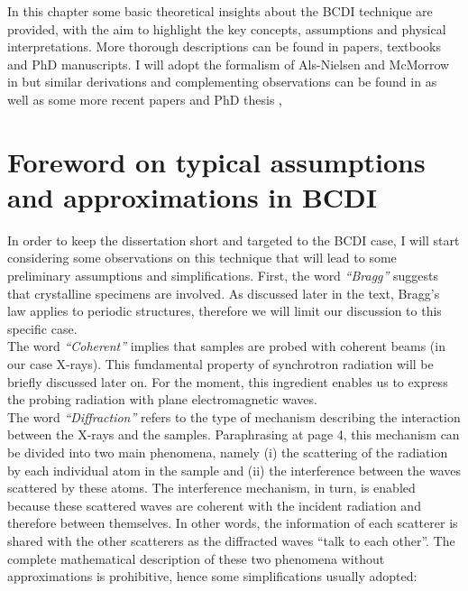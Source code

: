 
In this chapter some basic theoretical insights about the BCDI technique are provided, with the aim to highlight the key 
concepts, assumptions and physical interpretations. More thorough descriptions can be found in papers, textbooks 
and PhD manuscripts. I will adopt the formalism of Als-Nielsen and McMorrow in \cite{alsnielsen_mcmorrow2011} but similar 
derivations and complementing observations can be found in \cite{guinier1994, paganin2006coherent} as well as some more recent papers \cite{vartanyants2013coherentxraydiffractionimaging} 
and PhD thesis \cite{dupraz:tel-01285735, girard:tel-02906931}
, 

\section{Foreword on typical assumptions and approximations in BCDI}
In order to keep the dissertation short and targeted to the BCDI case, I will start considering some observations on this
technique that will lead to some preliminary assumptions and simplifications. First, the word \textit{``Bragg''} suggests that 
crystalline specimens are involved. As discussed later in the text, Bragg's law applies to periodic structures, therefore 
we will limit our discussion to this specific case. \\
The word \textit{``Coherent''} implies that samples are probed with coherent beams (in our case X-rays). This fundamental property of 
synchrotron radiation will be briefly discussed later on. For the moment, this ingredient enables us to express the 
probing radiation with plane electromagnetic waves. \\
The word \textit{``Diffraction''} refers to the type of mechanism describing the interaction between the X-rays and the 
samples. Paraphrasing \cite{guinier1994} at page 4, this mechanism can be divided into two main phenomena, namely (i) 
the scattering of the radiation by each individual atom in the sample and (ii) the interference between the waves scattered 
by these atoms. The interference mechanism, in turn, is enabled because these scattered waves are coherent with the incident 
radiation and therefore between themselves. In other words, the information of each scatterer is shared with the other scatterers 
as the diffracted waves ``talk to each other''. The complete mathematical description of these two phenomena without approximations 
is prohibitive, hence some simplifications usually adopted: 
